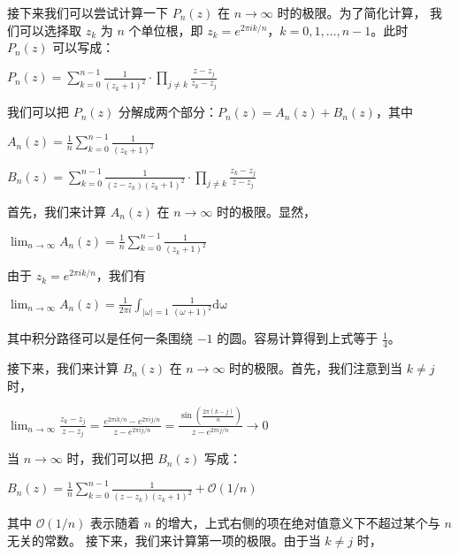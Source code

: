 \documentclass[12pt, a4paper, oneside]{article}
\begin{document}
\begin{spacing}{2.0}
接下来我们可以尝试计算一下 $P_n(z)$ 在 $n \to \infty$ 时的极限。为了简化计算，
我们可以选择取 $z_k$ 为 $n$ 个单位根，即 $z_k = e^{2 \pi i k/n}$，$k = 0, 1, \ldots, n-1$。此时 $P_n(z)$ 可以写成：
\begin{center}
    $P_n(z) = \sum_{k = 0}^{n-1}\frac{1}{(z_k + 1)^2} \cdot {\textstyle \prod_{j\neq k}}\frac{z - z_j}{z_k - z_j} $
\end{center}
我们可以把 $P_n(z)$ 分解成两个部分：$P_n(z) = A_n(z) + B_n(z)$，其中

\begin{center}
    $A_n(z) = \frac{1}{n}\sum_{k = 0}^{n-1}\frac{1}{(z_k + 1)^2}$
\end{center}

\begin{center}
    $B_n(z) = \sum_{k = 0}^{n-1}\frac{1}{(z - z_k)(z_k + 1)^2}\cdot {\textstyle \prod_{j\neq k}}\frac{z_k - z_j}{z - z_j} $
\end{center}

首先，我们来计算 $A_n(z)$ 在 $n \to \infty$ 时的极限。显然，
\begin{center}
    $\lim_{n\to \infty}A_n(z) = \frac{1}{n}\sum_{k = 0}^{n-1}\frac{1}{(z_k + 1)^2}$
\end{center}
由于 $z_k = e^{2 \pi i k/n}$，我们有
\begin{center}
    $\lim_{n\to \infty}A_n(z) = \frac{1}{2\pi i}\int_{|\omega| = 1}\frac{1}{(\omega + 1)^2}\mathrm{d\omega}$
\end{center}

其中积分路径可以是任何一条围绕 $-1$ 的圆。容易计算得到上式等于 $\frac{1}{4}$。

接下来，我们来计算 $B_n(z)$ 在 $n \to \infty$ 时的极限。首先，我们注意到当 $k \neq j$ 时，


\begin{center}
    $\lim_{n\to \infty}\frac{z_k - z_j}{z - z_j} = \frac{e^{2\pi ik/n}-e^{2\pi ij/n}}{z - e^{2\pi ij/n}} = \frac{\sin(\frac{2\pi (k-j)}{n})}{z - e^{2\pi ij/n}}\to 0$
\end{center}

当 $n \to \infty$ 时，我们可以把 $B_n(z)$ 写成：

\begin{center}
    $B_n(z) = \frac{1}{n}\sum_{k = 0}^{n-1}\frac{1}{(z - z_k)(z_k + 1)^2} + \mathcal{O}(1/n)$
\end{center}

其中 $\mathcal{O}(1/n)$ 表示随着 $n$ 的增大，上式右侧的项在绝对值意义下不超过某个与 $n$ 无关的常数。
接下来，我们来计算第一项的极限。由于当 $k \neq j$ 时，



\end{spacing}
\end{document}
